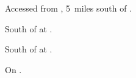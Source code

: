 
\begin{LocationList}

Accessed from , 5~miles south of .

South of  at .

South of  at .

On .

\end{LocationList}
